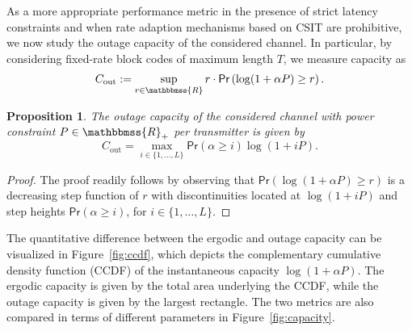 \documentclass[10pt,journal,a4paper]{IEEEtran}
\renewcommand{\P}{\mathsf{Pr}} 			%
\newcommand{\stdset}[1]{\mathbbmss{#1}}	%
\newtheorem{proposition}{Proposition}
\begin{document}
As a more appropriate performance metric in the presence of strict latency constraints and when rate adaption mechanisms based on CSIT are prohibitive, we now study the outage capacity of the considered channel. In particular, by considering fixed-rate block codes of maximum length $T$, we measure capacity as
\begin{align*}
C_{\mathrm{out}} := \sup_{r\in \stdset{R}} r\cdot \P\left(\log(1+\alpha P) \geq r\right).
\end{align*}
\begin{proposition}\label{prop:C_out}
The outage capacity of the considered channel with power constraint $P\in \stdset{R}_+$ per transmitter is given by
\begin{equation}\label{eq:C_out}
C_{\mathrm{out}} = \max_{i\in\{1,\ldots,L\}} \P(\alpha \geq i) \log(1+iP).
\end{equation}
\end{proposition}
\begin{proof}
The proof readily follows by observing that $\P\left(\log(1+\alpha P) \geq r\right)$ is a decreasing step function of $r$ with discontinuities located at $\log(1+iP)$ and step heights $\P(\alpha \geq i)$, for $i\in \{1,\ldots,L\}$.
\end{proof}
The quantitative difference between the ergodic and outage capacity can be visualized in Figure~\ref{fig:ccdf}, which depicts the complementary cumulative density function (CCDF) of the instantaneous capacity $\log(1+\alpha P)$. The ergodic capacity is given by the total area underlying the CCDF, while the outage capacity is given by the largest rectangle. The two metrics are also compared in terms of different parameters in Figure~\ref{fig:capacity}. 
\end{document}
